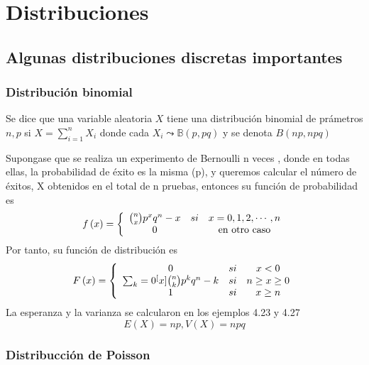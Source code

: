 


\section{Distribuciones}

\subsection{Algunas distribuciones discretas importantes}

\subsubsection{Distribuci\'{o}n binomial}

Se dice que una variable aleatoria $X$ tiene una distribuci\'{o}n binomial de
pr\'{a}metros $n,p$ si $X=\sum_{i=1}^{n}X_{i}$ donde cada $X_{i}%
\leadsto\mathbb{B}\left(  p,pq\right)  $ y se denota $B\left(  np,npq\right)  $%

\begin{definition}
Supongase que se realiza un experimento de Bernoulli n veces , donde en todas
ellas, la probabilidad de \'{e}xito es la misma (p), y queremos calcular el
n\'{u}mero de \'{e}xitos, X obtenidos en el total de n pruebas, entonces su
funci\'{o}n de probabilidad es \[ f\left(    x\right)    =\left\{
\begin{array}
[c]{ccc} \binom{n}{x}p^xq^n-x & si & x=0,1,2,\cdots,n\\ 0 &  & \text{en otro
caso}
\end{array}
\right.   \] Por tanto, su funci\'{o}n de distribuci\'{o}n es \[ F\left(
x\right)    =\left\{
\begin{array}
[c]{ccc} 0 & si & x<0\\ \sum_k=0^[x]\binom{n}{k}p^kq^n-k & si & n\geq x\geq0\\
1 & si & x\geq n
\end{array}
\right.   \] La esperanza y la varianza se calcularon en los ejemplos 4.23 y
4.27 \[ E\left(    X\right)    =np,V\left(    X\right)    =npq \]
\end{definition} 

\subsubsection{Distribucci\'{o}n de Poisson}

